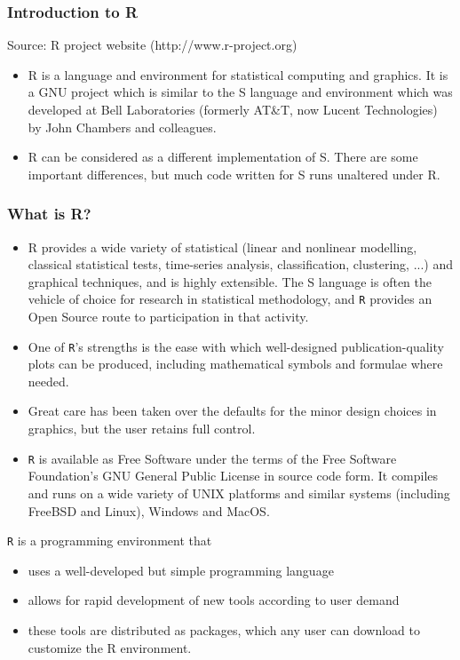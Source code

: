 \documentclass{beamer}
\begin{document}
 
 
 
 
 \frametitle{Introduction to R}
 Source: R project website (http://www.r-project.org)
 \begin{itemize}
 \item R is a language and environment for statistical computing and graphics. It is a GNU project
 which is similar to the S language and environment which was developed at Bell Laboratories
 (formerly AT\&T, now Lucent Technologies) by John Chambers and colleagues. 
 \item R can be considered
 as a different implementation of S. There are some important differences, but much
 code written for S runs unaltered under R.
 \end{itemize}
 
 
 
 
 \frametitle{What is R?}
 \begin{itemize}
 \item R provides a wide variety of statistical (linear and nonlinear modelling, classical statistical tests,
 time-series analysis, classification, clustering, ...) and graphical techniques, and is highly extensible.
 The S language is often the vehicle of choice for research in statistical methodology,
 and \texttt{R} provides an Open Source route to participation in that activity.
 \item One of \texttt{R}’s strengths is the ease with which well-designed publication-quality plots can be
 produced, including mathematical symbols and formulae where needed. 
 \item Great care has been
 taken over the defaults for the minor design choices in graphics, but the user retains full control.
 \item \texttt{R} is available as Free Software under the terms of the Free Software Foundation’s GNU General
 Public License in source code form. It compiles and runs on a wide variety of UNIX platforms
 and similar systems (including FreeBSD and Linux), Windows and MacOS.
 \end{itemize}
 
 
 
 \texttt{R} is a programming environment that
 \begin{itemize}
 \item uses a well-developed but simple programming language
 \item allows for rapid development of new tools according to user demand
 \item these tools are distributed as packages, which any user can download to customize the R
 environment.
 \end{itemize}
 
\end{document}
